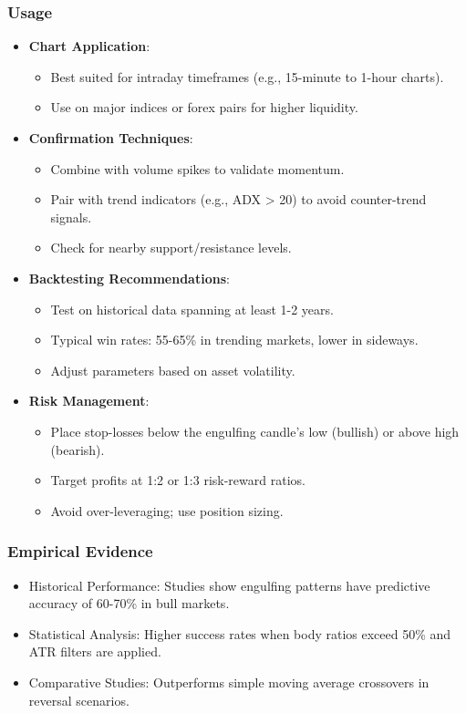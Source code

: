\documentclass[12pt]{article}
\begin{document}
\subsubsection{Usage}
\begin{itemize}
\item \textbf{Chart Application}:
  \begin{itemize}
  \item Best suited for intraday timeframes (e.g., 15-minute to 1-hour charts).
  \item Use on major indices or forex pairs for higher liquidity.
  \end{itemize}
\item \textbf{Confirmation Techniques}:
  \begin{itemize}
  \item Combine with volume spikes to validate momentum.
  \item Pair with trend indicators (e.g., ADX > 20) to avoid counter-trend signals.
  \item Check for nearby support/resistance levels.
  \end{itemize}
\item \textbf{Backtesting Recommendations}:
  \begin{itemize}
  \item Test on historical data spanning at least 1-2 years.
  \item Typical win rates: 55-65\% in trending markets, lower in sideways.
  \item Adjust parameters based on asset volatility.
  \end{itemize}
\item \textbf{Risk Management}:
  \begin{itemize}
  \item Place stop-losses below the engulfing candle's low (bullish) or above high (bearish).
  \item Target profits at 1:2 or 1:3 risk-reward ratios.
  \item Avoid over-leveraging; use position sizing.
  \end{itemize}
\end{itemize}

\subsubsection{Empirical Evidence}
\begin{itemize}
\item Historical Performance: Studies show engulfing patterns have predictive accuracy of 60-70\% in bull markets.
\item Statistical Analysis: Higher success rates when body ratios exceed 50\% and ATR filters are applied.
\item Comparative Studies: Outperforms simple moving average crossovers in reversal scenarios.
\end{itemize}
\end{document}

